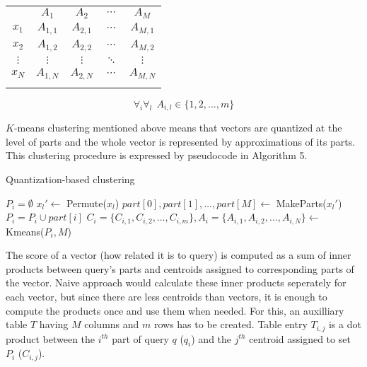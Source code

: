 \begin{center}
\renewcommand{\arraystretch}{1.2}
\begin{tabular}{c|c|c|c|c|}
\multicolumn{1}{r}{} & \multicolumn{1}{c}{$A_{1}$} & \multicolumn{1}{c}{$A_{2}$}
& \multicolumn{1}{c}{$\cdots$} & \multicolumn{1}{c}{$A_{M}$} \\
\hhline{~----}
$x_1$ & $A_{1,1}$ & $A_{2,1}$ & $\cdots$ & $A_{M,1}$ \\
\hhline{~----}
$x_2$ & $A_{1,2}$ & $A_{2,2}$ & $\cdots$ & $A_{M,2}$ \\
\hhline{~----}
$\vdots$ & $\vdots$ & $\vdots$ & $\ddots$ & $\vdots$ \\
\hhline{~----}
$x_N$ & $A_{1,N}$ & $A_{2,N}$ & $\cdots$ & $A_{M,N}$ \\
\hhline{~----}
\end{tabular}
\end{center}

\begin{equation*}
\forall_i \forall_l\ \  A_{i,l} \in \{1,2,...,m\}
\end{equation*}

$K$-means clustering mentioned above means that vectors are quantized at the level of parts
and the whole vector is represented by approximations of its parts.
This clustering procedure is expressed by pseudocode in Algorithm 5.

\begin{algorithm}
	\caption{Quantization-based clustering}
	\begin{algorithmic}
			\State $P_i = \emptyset$
		\EndFor
			\State $x_l' \gets$ Permute($x_l$)
			\State $part[0], part[1], \dots, part[M] \gets$ MakeParts($x_l'$)
				\State $P_i = P_i \cup part[i]$
			\EndFor
		\EndFor
			\State $C_i = \{C_{i,1}, C_{i,2}, \dots, C_{i,m}\}, A_i = \{A_{i,1}, A_{i,2}, \dots, A_{i,N}\} \gets$ Kmeans($P_i, M$)
		\EndFor
	\end{algorithmic}
\end{algorithm}

The score of a vector (how related it is to query) is computed as a sum of inner products
between query's parts and centroids assigned to corresponding parts of the vector.
Naive approach would calculate these inner products seperately for each vector,
but since there are less centroids than vectors, it is enough to compute the products once
and use them when needed.
For this, an auxilliary table $T$ having $M$ columns and $m$ rows has to be created.
Table entry $T_{i,j}$ is a dot product between the $i^{th}$ part of query $q$ ($q_i$) and the $j^{th}$
centroid assigned to set $P_i$ ($C_{i,j}$).

